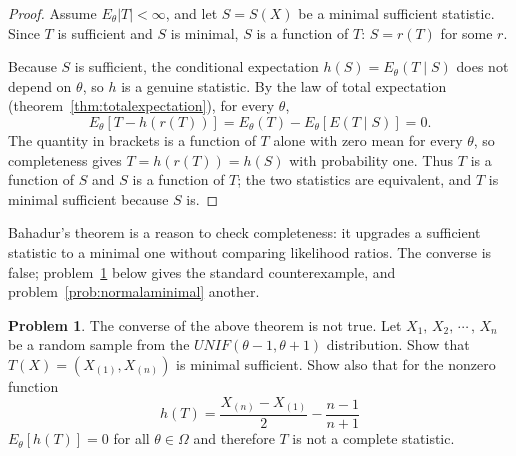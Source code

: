 \documentclass[12pt,a4paper]{report}
\theoremstyle{definition}
\newtheorem{problemx}{Problem}[section]
\newenvironment{problem}{\begin{problemx}}{\end{problemx}}
\begin{document}
\begin{proof}
Assume $E_\theta|T|<\infty$, and let $S = S(X)$ be a minimal sufficient statistic.
Since $T$ is sufficient and $S$ is minimal, $S$ is a function of $T$: $S = r(T)$
for some $r$.

Because $S$ is sufficient, the conditional expectation $h(S) = E_\theta(T\mid S)$
does not depend on $\theta$, so $h$ is a genuine statistic. By the law of total
expectation (theorem~\ref{thm:totalexpectation}), for every $\theta$,
\[E_\theta\left[T - h(r(T))\right] = E_\theta(T) - E_\theta\left[E(T\mid S)\right] = 0 .\]
The quantity in brackets is a function of $T$ alone with zero mean for every
$\theta$, so completeness gives $T = h(r(T)) = h(S)$ with probability one. Thus $T$
is a function of $S$ and $S$ is a function of $T$; the two statistics are
equivalent, and $T$ is minimal sufficient because $S$ is.
\end{proof}

Bahadur's theorem is a reason to check completeness: it upgrades a sufficient
statistic to a minimal one without comparing likelihood ratios. The converse is
false; problem~\ref{prob:minimalnotcomplete} below gives the standard
counterexample, and problem~\ref{prob:normalaminimal} another.

\begin{problem}
\label{prob:minimalnotcomplete}
The converse of the above theorem is not true. Let $X_1, \, X_2, \, \cdots\, , \, X_n$ be a random sample from the $UNIF(\theta - 1, \theta + 1)$ distribution. Show that $T(X) = \left(X_{(1)}, X_{(n)}\right)$ is minimal sufficient. Show also that for the nonzero function \[h(T) = \frac{X_{(n)} - X_{(1)}}{2} - \frac{n - 1}{n  + 1}\] $E_{\theta}\left[h(T)\right] =0$ for all $\theta \in \Omega$ and therefore $T$ is not a complete statistic.
\end{problem}
\end{document}
